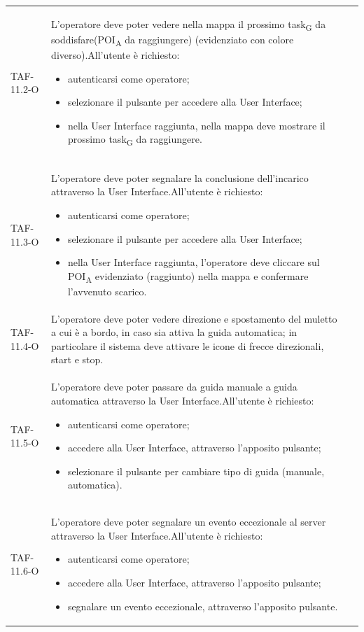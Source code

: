 \begin{longtable}{ >{\centering}p{} >{}p{}
		>{\centering}p{}}
	TAF-11.2-O & L'operatore deve poter vedere nella mappa il prossimo \gls{task}\textsubscript{G} da soddisfare(\acrshort{POI}\textsubscript{A} da raggiungere) (evidenziato con colore diverso).\newline All'utente è richiesto: \begin{itemize} \item autenticarsi come operatore; \item selezionare il pulsante per accedere alla User Interface; \item nella User Interface raggiunta, nella mappa deve mostrare il prossimo \gls{task}\textsubscript{G} da raggiungere.\end{itemize} & 0\tabularnewline
	
	TAF-11.3-O & L'operatore deve poter segnalare la conclusione dell'incarico attraverso la User Interface.\newline All'utente è richiesto: \begin{itemize} \item autenticarsi come operatore; \item selezionare il pulsante per accedere alla User Interface; \item nella User Interface raggiunta, l'operatore deve cliccare sul \acrshort{POI}\textsubscript{A} evidenziato (raggiunto) nella mappa e confermare l'avvenuto scarico.\end{itemize} & 0\tabularnewline
	
	TAF-11.4-O & L'operatore deve poter vedere direzione e spostamento del muletto a cui è a bordo, in caso sia attiva la guida automatica; in particolare il sistema deve attivare le icone di frecce direzionali, start e stop.  & 0\tabularnewline
	
	TAF-11.5-O & L'operatore deve poter passare da guida manuale a guida automatica attraverso la User Interface.\newline All'utente è richiesto: \begin{itemize} \item autenticarsi come operatore; \item accedere alla User Interface, attraverso l'apposito pulsante; \item selezionare il pulsante per cambiare tipo di guida (manuale, automatica). \end{itemize} & 0\tabularnewline
	
	TAF-11.6-O & L'operatore deve poter segnalare un evento eccezionale al server attraverso la User Interface.\newline All'utente è richiesto: \begin{itemize} \item autenticarsi come operatore; \item accedere alla User Interface, attraverso l'apposito pulsante; \item segnalare un evento eccezionale, attraverso l'apposito pulsante.\end{itemize} & 0\tabularnewline
	

\end{longtable}
